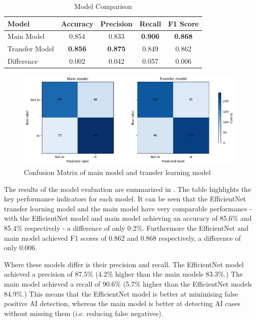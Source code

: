 \begin{table}[h]
\centering
\caption{Model Comparison}
\begin{tabular}{lcccc}
\toprule
\textbf{Model} & \textbf{Accuracy} & \textbf{Precision} & \textbf{Recall} & \textbf{F1 Score} \\
\midrule
Main Model     & 0.854          & 0.833          & \textbf{0.906} & \textbf{0.868} \\
Transfer Model & \textbf{0.856} & \textbf{0.875} & 0.849 & 0.862 \\
\midrule
Difference & 0.002 & 0.042 & 0.057 & 0.006 \\
\bottomrule
\end{tabular}
\label{tab:model_comparison}
\end{table}

\begin{figure}[h]
    \centering
    \includegraphics[width=0.9\linewidth]{figures/confusion_matrix.png} %
    \centering
    \caption{Confusion Matrix of main model and transfer learning model} %
    \label{fig:confusion_matrixes} %
\end{figure}

The results of the model evaluation are summarized in . The table highlights the key performance indicators for each model. It can be seen that the EfficientNet transfer learning model and the main model have very comparable performance - with the EfficientNet model and main model achieving an accuracy of 85.6\% and 85.4\% respectively - a difference of only 0.2\%. Furthermore the EfficientNet and main model achieved F1 scores of 0.862 and 0.868 respectively, a difference of only 0.006.

Where these models differ is their precision and recall. The EfficientNet model achieved a precision of 87.5\% (4.2\% higher than the main models 83.3\%.) The main model achieved a recall of 90.6\% (5.7\% higher than the EfficientNet models 84.9\%.) This means that the EfficientNet model is better at minimising false positive AI detection, whereas the main model is better at detecting AI cases without missing them (i.e. reducing false negatives). 


